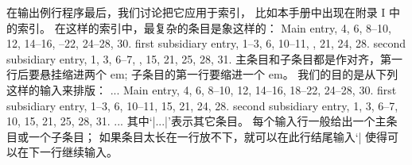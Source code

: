 \ddanger 在输出例行程序最后，我们讨论把它应用于索引，
比如本手册中出现在附录 I 中的索引。%
在这样的索引中，最复杂的条目是象这样的：
\begindisplay
Main entry, 4, 6, 8--10, 12, 14--16,\cr
{}--22, 24--28, 30.\cr
\quad first subsidiary entry, 1--3, 6, 10--11,\cr
{}, 21, 24, 28.\cr
\quad second subsidiary entry, 1, 3, 6--7,\cr
{}, 15, 21, 25, 28, 31.\cr
\enddisplay
主条目和子条目都是作对齐，第一行后要悬挂缩进两个 em;
子条目的第一行要缩进一个 em。%
我们的目的是从下列这样的输入来排版：
\begintt
\beginindex
...
Main entry, 4, 6, 8--10, 12, 14--16, 18--22, 24--28, 30.
\sub first subsidiary entry, 1--3, 6, 10--11, 15, 21, 24, 28.
\sub second subsidiary entry, 1, 3, 6--7, 10, 15, 21, 25, %
  28, 31.
...
\endindex
\endtt
其中`|...|'表示其它条目。%
每个输入行一般给出一个主条目或一个子条目；
如果条目太长在一行放不下，就可以在此行结尾输入`\]|%
使得可以在下一行继续输入。

